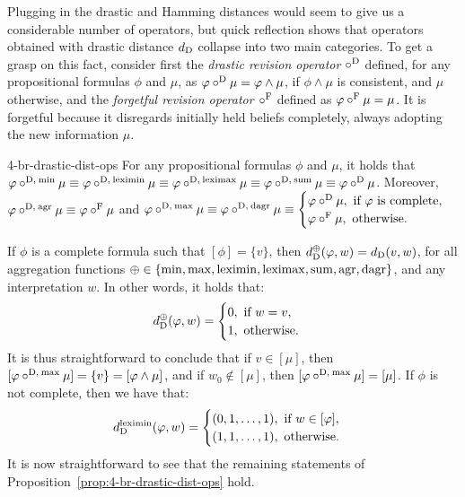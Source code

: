 Plugging in the drastic and Hamming distances  
would seem to give us a considerable number of operators,
but quick reflection shows that operators
obtained with drastic distance $d_{\operatorname{D}}$ collapse into two main categories.
To get a grasp on this fact, 
consider first the \textit{drastic revision operator $\circ^{\operatorname{D}}$} defined,
for any propositional formulas $\phi$ and $\mu$,
as
$\varphi\circ^{\operatorname{D}}\mu=\varphi\land\mu$, if $\phi\land\mu$ is consistent, and $\mu$ otherwise,
and the \textit{forgetful revision operator $\circ^{\mathrm{F}}$} defined as
$\varphi\circ^{\mathrm{F}}\mu=\mu$.
It is forgetful because it disregards initially held beliefs completely,
always adopting the new information $\mu$.

\begin{prp}{}{4-br-drastic-dist-ops}
	For any propositional formulas $\phi$ and $\mu$,
	it holds that 
	$\varphi\circ^{{\operatorname{D}},\:{\operatorname{min}}}\mu
	\equiv
	\varphi\circ^{{\operatorname{D}},\:{\operatorname{leximin}}}\mu
	\equiv
	\varphi\circ^{{\operatorname{D}},\:{\operatorname{leximax}}}\mu
	\equiv
	\varphi\circ^{{\operatorname{D}},\:{\operatorname{sum}}}\mu
	\equiv
	\varphi\circ^{\operatorname{D}}\mu$.
	Moreover, $\varphi\circ^{{\operatorname{D}},\:\mathrm{agr}}\mu\equiv\varphi\circ^{\mathrm{F}}\mu$ and
	$\varphi\circ^{{\operatorname{D}},\:{\operatorname{max}}}\mu\equiv\varphi\circ^{{\operatorname{D}},\:\mathrm{dagr}}\mu\equiv
	\begin{cases}
	\varphi\circ^{\operatorname{D}}\mu,~\text{if}~\varphi~\text{is complete},\\
	\varphi\circ^{\mathrm{F}}\mu,~\text{otherwise}.
	\end{cases}
	$
\end{prp}
\begin{prf*}{}{}%
	If $\phi$ is a complete formula
	such that $[\phi]=\{v\}$,
	then 
	$d^{\operatorname{\oplus}}_{\operatorname{D}}(\varphi,w)=d_{\operatorname{D}}(v,w)$,
	for all aggregation functions ${\operatorname{\oplus}}\in\{{\operatorname{min}},{\operatorname{max}},{\operatorname{leximin}},{\operatorname{leximax}},{\operatorname{sum}},\mathrm{agr},\mathrm{dagr}\}$,
	and any interpretation $w$.
	In other words, it holds that:
	$$
	d^{\operatorname{\oplus}}_{\operatorname{D}}(\varphi,w)=
		\begin{cases}
		0,~\text{if}~w=v,\\
		1,~\text{otherwise}.
		\end{cases}
	$$ 
	It is thus straightforward to conclude that if $v\in[\mu]$,
	then $[\varphi\circ^{{\operatorname{D}},\:{\operatorname{max}}}\mu]=\{v\}=[\varphi\land\mu]$,
	and if $w_0\notin[\mu]$,
	then $[\varphi\circ^{{\operatorname{D}},\:{\operatorname{max}}}\mu]=[\mu]$.
	If $\phi$ is not complete, then we have that:
	$$
	d^{\operatorname{leximin}}_{\operatorname{D}}(\varphi,w)=
		\begin{cases}
		(0,1,\dots,1),~\text{if}~w\in[\varphi],\\
		(1,1,\dots,1),~\text{otherwise}.
		\end{cases}
	$$
	It is now straightforward to see that the remaining
	statements of Proposition~\ref{prop:4-br-drastic-dist-ops} hold.
\end{prf*}

